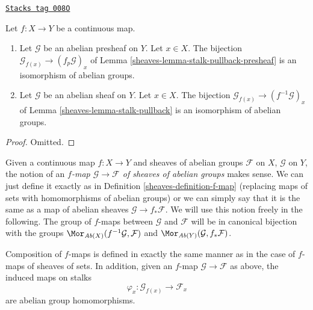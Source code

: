 \begin{lemma}
\label{sheaves-lemma-pullback-abelian-stalk}
\href{https://stacks.math.columbia.edu/tag/008O}{\texttt{Stacks tag 008O}}

Let $f : X \to Y$ be a continuous map.
\begin{enumerate}
\item Let $\mathcal{G}$ be an abelian presheaf on $Y$.
Let $x \in X$. The bijection
$\mathcal{G}_{f(x)} \to (f_p\mathcal{G})_x$ of
Lemma \ref{sheaves-lemma-stalk-pullback-presheaf} is an isomorphism of abelian groups.
\item Let $\mathcal{G}$ be an abelian sheaf on $Y$.
Let $x \in X$. The bijection
$\mathcal{G}_{f(x)} \to (f^{-1}\mathcal{G})_x$ of
Lemma \ref{sheaves-lemma-stalk-pullback} is an isomorphism of abelian groups.
\end{enumerate}
\end{lemma}

\begin{proof}
Omitted.
\end{proof}

Given a continuous map $f : X \to Y$ and sheaves of abelian
groups $\mathcal{F}$ on $X$, $\mathcal{G}$ on $Y$, the notion
of an {\it $f$-map $\mathcal{G} \to \mathcal{F}$
of sheaves of abelian groups} makes sense. We can just define
it exactly as in Definition \ref{sheaves-definition-f-map} (replacing maps
of sets with homomorphisms of abelian groups) or we can
simply say that it is the same as a map of abelian
sheaves $\mathcal{G} \to f_*\mathcal{F}$. We will use this
notion freely in the following. The group of $f$-maps between
$\mathcal{G}$ and $\mathcal{F}$ will be in canonical bijection
with the groups
$\Mor_{\textit{Ab}(X)}(f^{-1}\mathcal{G}, \mathcal{F})$
and
$\Mor_{\textit{Ab}(Y)}(\mathcal{G}, f_*\mathcal{F})$.

\medskip\noindent
Composition of $f$-maps is defined in exactly the
same manner as in the case of $f$-maps of sheaves of
sets. In addition, given an $f$-map $\mathcal{G} \to \mathcal{F}$
as above, the induced maps on stalks
$$
\varphi_x : \mathcal{G}_{f(x)} \longrightarrow \mathcal{F}_x
$$
are abelian group homomorphisms.

